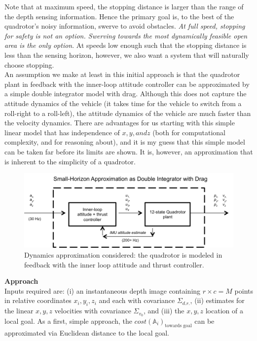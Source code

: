\documentclass[paper=a4, fontsize=11pt]{scrartcl} %
\numberwithin{equation}{section} %
\numberwithin{figure}{section} %
\numberwithin{table}{section} %
\begin{document}
Note that at maximum speed, the stopping distance is larger than the range of the depth sensing information.  Hence the primary goal is, to the best of the quadrotor's noisy information, swerve to avoid obstacles. \textit{At full speed, stopping for safety is not an option. Swerving towards the most dynamically feasible open area is the only option}.  At speeds low enough such that the stopping distance is less than the sensing horizon, however, we also want a system that will naturally choose stopping. \\

An assumption we make at least in this initial approach is that the quadrotor plant in feedback with the inner-loop attitude controller can be approximated by a simple double integrator model with drag.  Although this does not capture the attitude dynamics of the vehicle (it takes time for the vehicle to switch from a roll-right to a roll-left), the attitude dynamics of the vehicle are much faster than the velocity dynamics.  There are advantages for us starting with this simple linear model that has independence of $x, y, and z$ (both for computational complexity, and for reasoning about), and it is my guess that this simple model can be taken far before its limits are shown. It is, however, an approximation that is inherent to the simplicity of a quadrotor.

\begin{figure}
  \includegraphics[width=\linewidth]{double_integrator_approximation.png}
  \caption{Dynamics approximation considered: the quadrotor is modeled in feedback with the inner loop attitude and thrust controller.}
  \label{fig:boat1}
\end{figure}

\textbf{Approach}
\\

Inputs required are: (i) an instantaneous depth image containing $r \times c = M$ points in relative coordinates $x_i, y_i, z_i$ and each with covariance $\Sigma_{d.r.}$, (ii) estimates for the linear $x, y, z$ velocities with covariance $\Sigma_{v_0}$, and (iii) the $x,y,z$ location of a local goal.  As a first, simple approach, the $cost(\mathbb{A}_i)_{\text{towards goal}} $ can be approximated via Euclidean distance to the local goal.\\
\end{document}
